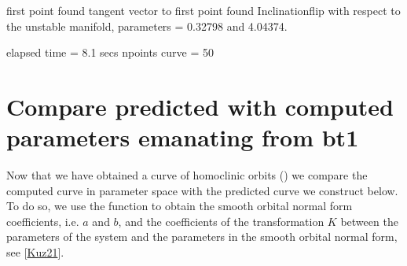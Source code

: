 \documentclass[letterpaper,10pt,english]{jupyterBook}
\begin{document}
\begin{sphinxVerbatim}[commandchars=\\\{\}]
\PYG{p}{[}\PYG{p}{]}
\end{sphinxVerbatim}

\begin{sphinxVerbatim}[commandchars=\\\{\}]
first point found
tangent vector to first point found
Inclination\PYGZhy{}flip with respect to the unstable manifold, parameters = 0.32798 and 4.04374.

elapsed time  = 8.1 secs
npoints curve = 50
\end{sphinxVerbatim}


\section{Compare predicted with computed parameters emanating from bt1}
\label{\detokenize{HomoclinicRGflows:compare-predicted-with-computed-parameters-emanating-from-bt1}}
\sphinxAtStartPar
Now that we have obtained a curve of homoclinic orbits () we
compare the computed curve in parameter space with the predicted curve we
construct below. To do so, we use the function  to obtain the
smooth orbital normal form coefficients, i.e. \(a\) and \(b\), and the coefficients
of the transformation \(K\) between the parameters of the system and the parameters
in the smooth orbital normal form, see {[}\hyperlink{cite.references:id3}{Kuz21}{]}.
\end{document}
